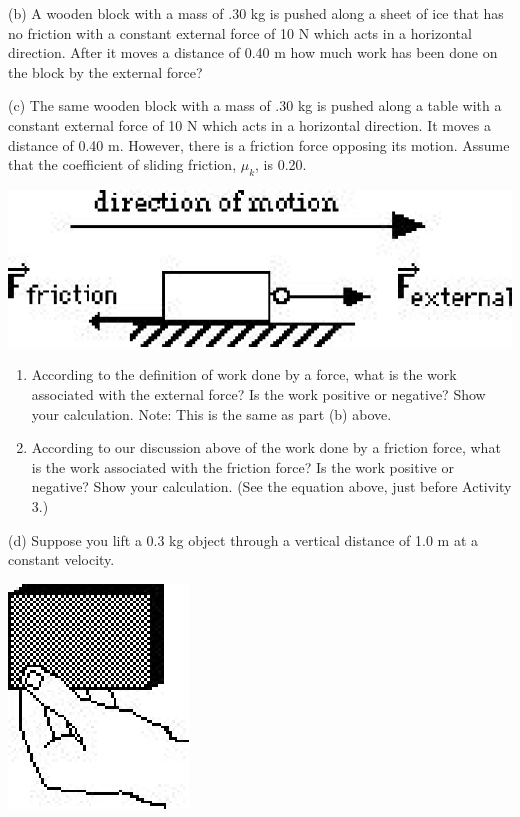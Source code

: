 (b) A wooden block with a mass of .30 kg is pushed along a sheet of ice that
has no friction with a constant external force of 10 N which acts in a 
horizontal direction. After it moves a distance of 0.40 m how much work has 
been done on the block by the external force?
\vspace{20mm}

(c) The same wooden block with a mass of .30 kg is pushed along a table with
a constant external force of 10 N which acts in a horizontal direction. It moves
a distance of 0.40 m. However, there is a friction force opposing its motion.
Assume that the coefficient of sliding friction, \( \mu _{k} \), is 0.20. 

\vspace{0.3cm}
{\par\centering \includegraphics{work_power/work_power_fig4.eps} \par}
\vspace{0.3cm}

\begin{enumerate}
\item According to the definition of work done by a force, what is the work associated with the external force? Is the work positive or negative? Show your calculation. Note: This is the same as part (b) above.
\vspace{20mm}

\item According to our discussion above of the work done by a friction force, what is the work associated with the friction force? Is the work positive or negative? Show your calculation. (See the equation above, just before Activity 3.)
\vspace{20mm}

\end{enumerate}
(d) Suppose you lift a 0.3 kg object through a vertical distance of 1.0 m at a constant velocity.

\vspace{0.3cm}
{\par\centering \includegraphics{work_power/work_power_fig5.eps} \par}
\vspace{0.3cm}

